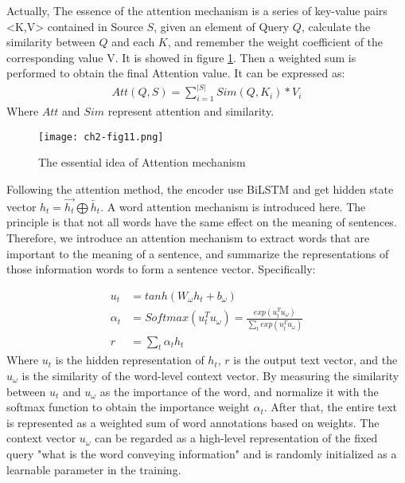 Actually, The essence of the attention mechanism is a series of key-value pairs <K,V> contained in Source $S$, given an element of Query $Q$, calculate the similarity between $Q$ and each $K$, and remember the weight coefficient of the corresponding value V. It is showed in figure \ref{ch2-fig10}. Then a weighted sum is performed to obtain the final Attention value. It can be expressed as:
\begin{align}
	Att(Q,S) = \sum_{i=1}^{|S|}Sim(Q,K_i)*V_i
\end{align}
Where $Att$ and $Sim$ represent attention and similarity.

\begin{figure}[h]
	\centering
	\texttt{[image: ch2-fig11.png]}
	\caption{The essential idea of Attention mechanism}
	\label{ch2-fig10}
\end{figure}
Following the attention method, the encoder use BiLSTM and get hidden state vector $h_t=\overrightarrow{h_t}\bigoplus \overleftarrow{h_t}$. A word attention mechanism is introduced here. The principle is that not all words have the same effect on the meaning of sentences. Therefore, we introduce an attention mechanism to extract words that are important to the meaning of a sentence, and summarize the representations of those information words to form a sentence vector.
Specifically:



\begin{align}
	u_t      & = tanh(W_\omega h_t + b_\omega )                                                   \\
	\alpha_t & =Softmax(u_t^T u_\omega) = \frac{exp( u_t^T u_\omega)}{\sum_t exp(u_t^T u_\omega)} \\
	r        & = \sum_t{\alpha_t h_t}
\end{align}
Where $u_t$ is the hidden representation of $h_t$, $r$ is the output text vector, and the $u_\omega$ is the similarity of the word-level context vector. By measuring the similarity between $u_t$ and $u_\omega$ as the importance of the word, and normalize it with the softmax function to obtain the importance weight $\alpha_{t}$. After that, the entire text is represented as a weighted sum of word annotations based on weights. The context vector $u_\omega$ can be regarded as a high-level representation of the fixed query "what is the word conveying information" and is randomly initialized as a learnable parameter in the training.

